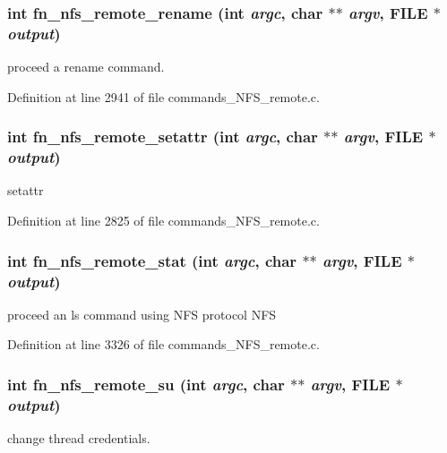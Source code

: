 \subsubsection[{fn\_\-nfs\_\-remote\_\-rename}]{\setlength{\rightskip}{0pt plus 5cm}int fn\_\-nfs\_\-remote\_\-rename (int {\em argc}, \/  char $\ast$$\ast$ {\em argv}, \/  FILE $\ast$ {\em output})}\label{commands__NFS__remote_8c_a385e00e4402183dcf9d7bbc6d17de3da}
proceed a rename command. 

Definition at line 2941 of file commands\_\-NFS\_\-remote.c.
\subsubsection[{fn\_\-nfs\_\-remote\_\-setattr}]{\setlength{\rightskip}{0pt plus 5cm}int fn\_\-nfs\_\-remote\_\-setattr (int {\em argc}, \/  char $\ast$$\ast$ {\em argv}, \/  FILE $\ast$ {\em output})}\label{commands__NFS__remote_8c_a6cd8456d9ed8ef731cb45ccb4168847a}
setattr 

Definition at line 2825 of file commands\_\-NFS\_\-remote.c.
\subsubsection[{fn\_\-nfs\_\-remote\_\-stat}]{\setlength{\rightskip}{0pt plus 5cm}int fn\_\-nfs\_\-remote\_\-stat (int {\em argc}, \/  char $\ast$$\ast$ {\em argv}, \/  FILE $\ast$ {\em output})}\label{commands__NFS__remote_8c_aa1c93ad1ec1bd3c6b83787fbf3983a1f}
proceed an ls command using NFS protocol NFS 

Definition at line 3326 of file commands\_\-NFS\_\-remote.c.
\subsubsection[{fn\_\-nfs\_\-remote\_\-su}]{\setlength{\rightskip}{0pt plus 5cm}int fn\_\-nfs\_\-remote\_\-su (int {\em argc}, \/  char $\ast$$\ast$ {\em argv}, \/  FILE $\ast$ {\em output})}\label{commands__NFS__remote_8c_a7e50bf8f40b54033ee4afb6055b2aac2}
change thread credentials. 

